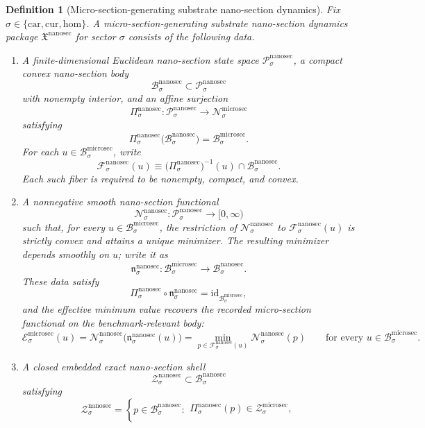 \documentclass[11pt]{article}
\newcommand{\Car}{\mathrm{car}}
\newcommand{\Cur}{\mathrm{cur}}
\newcommand{\Hom}{\mathrm{hom}}
\newcommand{\MicroSectionSpace}[1]{\mathcal N_{#1}^{\mathrm{microsec}}}
\newcommand{\MicroSectionBody}[1]{\mathcal B_{#1}^{\mathrm{microsec}}}
\newcommand{\MicroSectionFunctional}[1]{\mathscr E_{#1}^{\mathrm{microsec}}}
\newcommand{\MicroSectionShell}[1]{\mathcal Z_{#1}^{\mathrm{microsec}}}
\newcommand{\NanoSectionPackage}{\mathfrak X^{\mathrm{nanosec}}}
\newcommand{\NanoSectionSpace}[1]{\mathcal P_{#1}^{\mathrm{nanosec}}}
\newcommand{\NanoSectionBody}[1]{\mathcal B_{#1}^{\mathrm{nanosec}}}
\newcommand{\NanoSectionProj}[1]{\Pi_{#1}^{\mathrm{nanosec}}}
\newcommand{\NanoSectionFiber}[2]{\mathcal F_{#1}^{\mathrm{nanosec}}(#2)}
\newcommand{\NanoSectionMicroMin}[1]{\mathfrak n_{#1}^{\mathrm{nanosec}}}
\newcommand{\NanoSectionFunctional}[1]{\mathscr N_{#1}^{\mathrm{nanosec}}}
\newcommand{\NanoSectionShell}[1]{\mathcal Z_{#1}^{\mathrm{nanosec}}}
\newtheorem{definition}{Definition}
\begin{document}
\begin{definition}[Micro-section-generating substrate nano-section dynamics]
\label{def:nanosec}
Fix \(\sigma\in\{\Car,\Cur,\Hom\}\). A micro-section-generating substrate nano-section dynamics package \(\NanoSectionPackage\) for sector \(\sigma\) consists of the following data.
\begin{enumerate}
    \item A finite-dimensional Euclidean nano-section state space \(\NanoSectionSpace{\sigma}\), a compact convex nano-section body
    \[
    \NanoSectionBody{\sigma}\subset\NanoSectionSpace{\sigma}
    \]
    with nonempty interior, and an affine surjection
    \[
    \NanoSectionProj{\sigma}:\NanoSectionSpace{\sigma}\to\MicroSectionSpace{\sigma}
    \]
    satisfying
    \[
    \NanoSectionProj{\sigma}\bigl(\NanoSectionBody{\sigma}\bigr)=\MicroSectionBody{\sigma}.
    \]
    For each \(u\in\MicroSectionBody{\sigma}\), write
    \[
    \NanoSectionFiber{\sigma}{u}
    \equiv
    \bigl(\NanoSectionProj{\sigma}\bigr)^{-1}(u)\cap\NanoSectionBody{\sigma}.
    \]
    Each such fiber is required to be nonempty, compact, and convex.
    \item A nonnegative smooth nano-section functional
    \[
    \NanoSectionFunctional{\sigma}:\NanoSectionSpace{\sigma}\to[0,\infty)
    \]
    such that, for every \(u\in\MicroSectionBody{\sigma}\), the restriction of \(\NanoSectionFunctional{\sigma}\) to \(\NanoSectionFiber{\sigma}{u}\) is strictly convex and attains a unique minimizer. The resulting minimizer depends smoothly on \(u\); write it as
    \[
    \NanoSectionMicroMin{\sigma}:\MicroSectionBody{\sigma}\to\NanoSectionBody{\sigma}.
    \]
    These data satisfy
    \[
    \NanoSectionProj{\sigma}\circ\NanoSectionMicroMin{\sigma}
    =
    \mathrm{id}_{\MicroSectionBody{\sigma}},
    \]
    and the effective minimum value recovers the recorded micro-section functional on the benchmark-relevant body:
    \[
    \MicroSectionFunctional{\sigma}(u)
    =
    \NanoSectionFunctional{\sigma}\bigl(\NanoSectionMicroMin{\sigma}(u)\bigr)
    =
    \min_{p\in\NanoSectionFiber{\sigma}{u}}
    \NanoSectionFunctional{\sigma}(p)
    \qquad
    \text{for every }
    u\in\MicroSectionBody{\sigma}.
    \]
    \item A closed embedded exact nano-section shell
    \[
    \NanoSectionShell{\sigma}\subset\NanoSectionBody{\sigma}
    \]
    satisfying
    \[
    \NanoSectionShell{\sigma}
    =
    \left\{
    p\in\NanoSectionBody{\sigma}:
    \begin{array}{l}
    \NanoSectionProj{\sigma}(p)\in\MicroSectionShell{\sigma},\\[0.2em]

\end{array}\]
\end{enumerate}
\end{definition}
\end{document}
